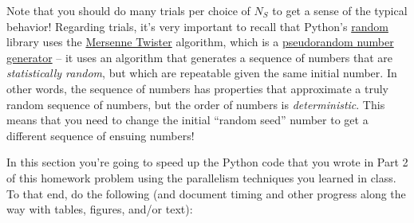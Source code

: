 \documentclass[10pt]{article}
\begin{document}
Note that you should do many trials per choice of $N_S$ to get a sense
of the typical
behavior!  Regarding trials, it's very important to recall that Python's \href{https://docs.python.org/3/library/random.html}{random} library
uses the
\href{https://en.wikipedia.org/wiki/Mersenne_Twister}{Mersenne
  Twister} algorithm, which is a \href{https://en.wikipedia.org/wiki/Pseudorandom_number_generator}{pseudorandom number generator} -- it uses an algorithm that
generates a sequence of numbers that are \textit{statistically random},
but which are repeatable given the same initial number. In other
words, the sequence of numbers has properties that approximate a truly
random sequence of numbers, but the order of numbers is \textit{deterministic}.  This means
that you need to change the initial ``random seed'' number to get a
different sequence of ensuing numbers!


\newpage
{}  In this section you're going to
speed up the Python code that you wrote in Part 2 of this homework
problem using the parallelism techniques you learned in class.  To
that end, do the following (and document timing and other progress
along the way with tables, figures, and/or text):
\end{document}
